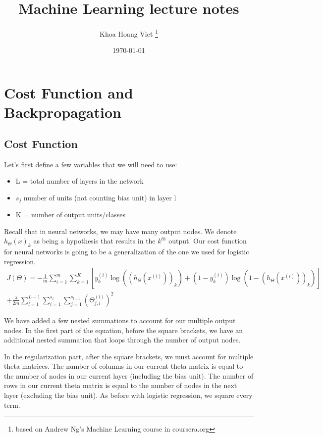 \documentclass{article}
\title{Machine Learning lecture notes}
\author{Khoa Hoang Viet \thanks{based on Andrew Ng's Machine Learning course in coursera.org}}
\date{\today}
\begin{document}
 
\lstset{style=mystyle}

\section{Cost Function and Backpropagation}
\subsection{Cost Function}
Let's first define a few variables that we will need to use:
\begin{itemize}
  	\item L = total number of layers in the network
  	\item $s_j$ number of units (not counting bias unit) in layer l
  	\item K = number of output units/classes
\end{itemize}

Recall that in neural networks, we may have many output nodes. We denote $h_\Theta(x)_k$  as being a hypothesis that results in the $k^{th}$ output. Our cost function for neural networks is going to be a generalization of the one we used for logistic regression. 
\begin{gather*} 
	J(\Theta) = - \frac{1}{m} \sum_{i=1}^m \sum_{k=1}^K \left[y^{(i)}_k \log ((h_\Theta (x^{(i)}))_k) + (1 - y^{(i)}_k)\log (1 - (h_\Theta(x^{(i)}))_k)\right] \\ 
	+ \frac{\lambda}{2m}\sum_{l=1}^{L-1} \sum_{i=1}^{s_l} \sum_{j=1}^{s_{l+1}} ( \Theta_{j,i}^{(l)})^2
\end{gather*}

We have added a few nested summations to account for our multiple output nodes. In the first part of the equation, before the square brackets, we have an additional nested summation that loops through the number of output nodes.

In the regularization part, after the square brackets, we must account for multiple theta matrices. The number of columns in our current theta matrix is equal to the number of nodes in our current layer (including the bias unit). The number of rows in our current theta matrix is equal to the number of nodes in the next layer (excluding the bias unit). As before with logistic regression, we square every term.
\end{document}
